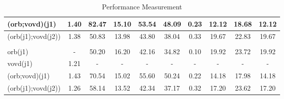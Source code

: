 \begin{table}[ht!]
{\begin{tabular}{|l|c|c|c|c|c|c|c|c|c|}
			(orb;vovd)(j1)      	& 1.40 & 82.47 & 15.10  & 53.54 & 48.09 & 0.23 & 12.12 & 18.68 & 12.12		\\ \hline
			(orb(j1);vovd(j2))  & 1.38 & 50.83 & 13.98  & 43.80 & 38.04 & 0.33 & 19.67 & 22.83 & 19.67		\\ \hline
			\rowcolor{Gray}
			\multicolumn{10}{|c|}{Kubeedge - Performance Measurement: camera 20 Hz}  \\
			\hline
			orb(j1)     					 & -    	 & 50.20 & 16.20 & 42.16 & 34.82 & 0.10 & 19.92  & 23.72   & 19.92  \\ \hline
			vovd(j1)       	 			  & 1.21 & -			& -     	   & -     		 & -     		& -    		& -     		& -     		& -     		\\ \hline
			(orb;vovd)(j1)      	& 1.43 & 70.54 & 15.02  & 55.60 & 50.24 & 0.22 & 14.18 	& 17.98	 & 14.18  \\ \hline
			(orb(j1);vovd(j2))  & 1.26 & 58.14 & 13.52  & 42.34 & 37.17 & 0.32 & 17.20 	& 23.62  & 17.20  \\ \hline
	\end{tabular}}
	\caption{Performance Measurement\label{tab:Performance-Measurement}}
\end{table}





